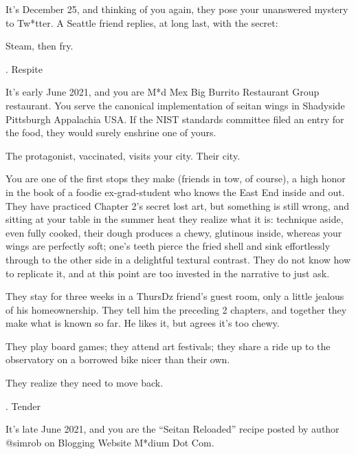 \documentclass[12pt]{article}
\newcommand\chapter[2]{{\thispagestyle{empty} \Large \sc #1. \quad #2

\vspace{1.5em}}}
\begin{document}
It's December 25, and thinking of you again, they pose your unanswered mystery to Tw*tter.
A Seattle friend replies, at long last, with the secret:

Steam, then fry.

\newpage \thispagestyle{empty}

\chapter{3}{Respite}

It's early June 2021, and you are M*d Mex Big Burrito Restaurant Group restaurant.
%
You serve the canonical implementation of seitan wings
in Shadyside Pittsburgh Appalachia USA.
If the NIST standards committee filed an entry for the food, they would surely enshrine one of yours.

The protagonist, vaccinated, visits your city. Their city.

You are one of the first stops they make
(friends in tow, of course),
a high honor in the book of a foodie ex-grad-student who knows the East End inside and out.
They have practiced Chapter 2's secret lost art, but something is still wrong,
and sitting at your table in the summer heat they realize what it is:
technique aside, even fully cooked, their dough produces a chewy, glutinous inside,
whereas your wings are perfectly soft;
one's teeth pierce the fried shell and sink effortlessly through to the other side
in a delightful textural contrast.
They do not know how to replicate it, and at this point are too invested in the narrative to just ask.

They stay for three weeks in a ThursDz friend's guest room, only a little jealous of his homeownership.
They tell him the preceding 2 chapters, and together they make what is known so far.
He likes it, but agrees it's too chewy.

They play board games; they attend art festivals; they share a ride up to the observatory on a borrowed bike nicer than their own.

They realize they need to move back.

\newpage \thispagestyle{empty}

\chapter{4}{Tender}

It's late June 2021, and you are the ``Seitan Reloaded'' recipe posted by author {\sf @simrob} on Blogging Website M*dium Dot Com.
\end{document}
